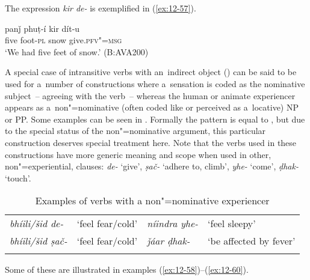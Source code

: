 The expression \textit{kir de-} is exemplified in (\ref{ex:12-57}).

\begin{exe}
\ex
\label{ex:12-57}
\gll panǰ phuṭ-í kir dít-u \\
five foot-\textsc{pl} snow give.\textsc{pfv"=msg} \\
\glt `We had five feet of snow.' (B:AVA200)
\end{exe}

 A special case of intransitive verbs with an~indirect object () can be said to be used for a~number of constructions where a~sensation is coded as the nominative subject~-- agreeing with the verb~-- whereas the human or animate experiencer appears as a~non"=nominative (often coded like or perceived as a~locative) NP or PP. Some examples can be seen in . Formally the pattern is equal to , but due to the special status of the non"=nominative argument, this particular construction deserves special treatment here. Note that the verbs used in these constructions have more generic meaning and scope when used in other, non"=experiential, clauses: \textit{de-} `give', \textit{ṣač-} `adhere to, climb', \textit{yhe-} `come', \textit{ḍhak-} `touch'.


\begin{table}[H]
\caption{Examples of verbs with a non"=nominative experiencer}
\begin{tabularx}{\textwidth}{ Q Q Q Q }
\lsptoprule
\textit{bhíili/šid de-} &
`feel fear/cold' &
\textit{níindra yhe-} &
`feel sleepy'\\
\textit{bhíili/šid ṣač-} &
`feel fear/cold' &
\textit{ǰáar ḍhak-} &
`be affected by fever'\\\lspbottomrule
\end{tabularx}
\label{tab:12-nnom}
\end{table}


Some of these are illustrated in examples (\ref{ex:12-58})--(\ref{ex:12-60}).

